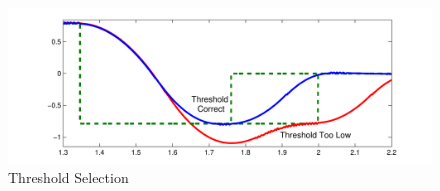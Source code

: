 

\begin{figure}[htp]
    \centering
    \includegraphics[width=.8\textwidth]{images/ThresholdSelection.pdf}
    \caption{Threshold Selection}
    \label{fig:threshold}
\end{figure}
